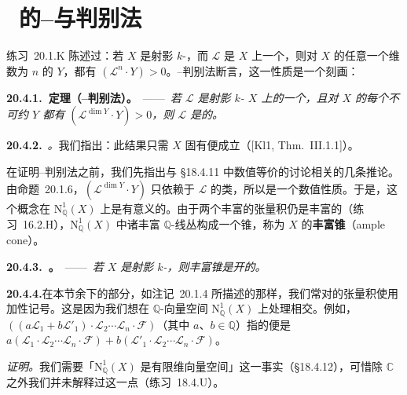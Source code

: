 
\section{\extrahard\ \trAmpleness{}的\trNakai--\trMoishezon{}与\trKleiman{}判别法}

\mbox{练习~20.1.K} 陈述过：若 $X$ 是射影 $k$-\trVariety，而 $\mathscr{L}$ 是 $X$ 上一个\trAmple{}\trLineBundle，则对 $X$ 的任意一个维数为 $n$ 的\trSubvariety{} $Y$，都有 $(\mathscr{L}^n\cdot Y)>0$。\trNakai--\trMoishezon{}判别法断言，这一性质是一个刻画：

\textbf{20.4.1.\ 定理（\trNakai--\trMoishezon{}\trAmpleness{}判别法）。}\ ——\ \emph{若 $\mathscr{L}$ 是射影 $k$-\trScheme{} $X$ 上的一个\trInvertibleSheaf，且对 $X$ 的每个不可约\trSubvariety{} $Y$ 都有 $(\mathscr{L}^{\dim Y}\cdot Y)>0$，则 $\mathscr{L}$ 是\trAmple{}的。}

\textbf{20.4.2.}\ \emph{\trhRemark。}\quad 我们指出：此结果只需 $X$ 固有便成立（[Kl1, Thm.~III.1.1]）。

在证明\trNakai--\trMoishezon{}判别法之前，我们先指出与 \S18.4.11 中数值等价的讨论相关的几条推论。由\mbox{命题~20.1.6}，$(\mathscr{L}^{\dim Y}\cdot Y)$ 只依赖于 $\mathscr{L}$ 的\trNumericallyEquivalent{}类，所以\trAmpleness{}是一个数值性质。于是，\trAmpleness{}这个概念在 $\mathrm{N}^1_{\mathbb{Q}}(X)$ 上是有意义的。由于两个丰富\trInvertibleSheaf{}的张量积仍是丰富的（\mbox{练习~16.2.H}），$\mathrm{N}^1_{\mathbb{Q}}(X)$ 中诸丰富 $\mathbb{Q}$-线丛构成一个锥，称为 $X$ 的\textbf{丰富锥}（ample cone）。

\textbf{20.4.3.\ \trhProposition。}\ ——\ \emph{若 $X$ 是射影 $k$-\trScheme，则丰富锥是开的。}

\textbf{20.4.4.}\quad 在本节余下的部分，如\mbox{注记~20.1.4} 所描述的那样，我们常对\trInvertibleSheaf{}的张量积使用加性记号。这是因为我们想在 $\mathbb{Q}$-向量空间 $\mathrm{N}^1_{\mathbb{Q}}(X)$ 上处理相交。例如，$((a\mathscr{L}_1+b\mathscr{L}'_1)\cdot\mathscr{L}_2\cdots\mathscr{L}_n\cdot\mathscr{F})$（其中 $a$、$b\in\mathbb{Q}$）指的便是 $a(\mathscr{L}_1\cdot\mathscr{L}_2\cdots\mathscr{L}_n\cdot\mathscr{F})+b(\mathscr{L}'_1\cdot\mathscr{L}_2\cdots\mathscr{L}_n\cdot\mathscr{F})$。

\emph{证明。}\quad 我们需要「$\mathrm{N}^1_{\mathbb{Q}}(X)$ 是有限维向量空间」这一事实（\S18.4.12），可惜除 $\mathbb{C}$ 之外我们并未解释过这一点（\mbox{练习~18.4.U}）。

